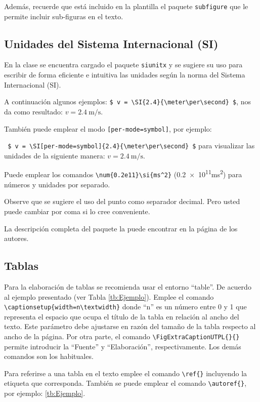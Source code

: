 Además, recuerde que está incluido en la plantilla el paquete \texttt{subfigure} que le permite incluir sub-figuras en el texto. 


\subsection{Unidades del Sistema Internacional (SI)}
En la clase se encuentra cargado el paquete \lstinline|siunitx| y se sugiere su uso para escribir de forma eficiente e intuitiva las unidades  según la norma del Sistema Internacional (SI). 

A continuación algunos ejemplos: 
\lstinline|$ v = \SI{2.4}{\meter\per\second} $|, nos da como resultado: $ v = \SI{2.4}{\meter\per\second} $. 

También puede emplear el modo \lstinline|[per-mode=symbol]|, por ejemplo:

\lstinline| $ v = \SI[per-mode=symbol]{2.4}{\meter\per\second} $| para visualizar las unidades de la siguiente manera: $ v = \SI[per-mode=symbol]{2.4}{\meter\per\second} $. 

Puede emplear los comandos \lstinline|\num{0.2e11}\si{ms^2}| (\num{0.2e11}\si{ms^2}) para números y unidades por separado. 

Observe que se sugiere el uso del punto como separador decimal. Pero usted puede cambiar por coma si lo cree conveniente.

La descripción completa del paquete la puede encontrar en la página de los autores. 


\subsection{Tablas}
Para la elaboración de tablas se recomienda usar el entorno ``table''. De acuerdo al ejemplo presentado (ver Tabla \ref{tb:Ejemplo}). Emplee el comando \lstinline|\captionsetup{width=n\textwidth}| donde ``n'' es un número entre 0 y 1 que representa el espacio que ocupa el título de la tabla en relación al ancho del texto. Este parámetro debe ajustarse en razón del tamaño de la tabla respecto al ancho de la página. Por otra parte, el comando \lstinline|\FigExtraCaptionUTPL{}{}| permite introducir la ``Fuente'' y ``Elaboración'', respectivamente. Los demás comandos son los habituales. 

Para referirse a una tabla en el texto emplee el comando \lstinline|\ref{}| incluyendo la etiqueta que corresponda. También se puede emplear el comando \lstinline|\autoref{}|, por ejemplo: \autoref{tb:Ejemplo}.

